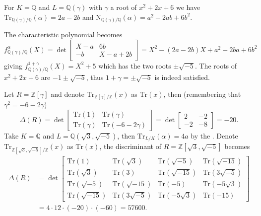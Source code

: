 \documentclass[openany, a4paper, 10pt]{book}
\theoremstyle{plain}
\theoremstyle{plain}
\theoremstyle{plain}
\theoremstyle{definition}
\theoremstyle{plain}
\theoremstyle{definition}
\theoremstyle{remark}
\begin{document}
\begin{examplebox}
    \tcbline
    For $K = \mathbb Q$ and $L = \mathbb Q(\gamma)$ with $\gamma$ a root of $x^2+2x+6$ we have
    $\mathrm{Tr}_{\mathbb Q(\gamma)/\mathbb Q}(\alpha) = 2a-2b$
    and
    $\mathrm{N}_{\mathbb Q(\gamma)/\mathbb Q}(\alpha) = a^2-2ab+6b^2$.

    The characteristic polynomial becomes
    $$f_{\mathbb Q(\gamma)/\mathbb Q}^\alpha(X) = \det \begin{bmatrix} X-a & 6b \\ -b & X-a+2b \end{bmatrix} = X^2 - (2a-2b)X + a^2-2ba+6b^2$$
    giving
    $f_{\mathbb Q(\gamma)/\mathbb Q}^{1+\gamma}(X) = X^2+5$
    which has the two roots $\pm\sqrt{-5}$.
    The roots of $x^2+2x+6$ are $-1 \pm \sqrt{-5}$, thus $1+\gamma = \pm \sqrt{-5}$ is indeed satisfied.

    Let $R = \mathbb Z[\gamma]$ and denote $\mathrm{Tr}_{\mathbb Z[\gamma]/\mathbb Z}(x)$ as $\mathrm{Tr}(x)$, then (remembering that $\gamma^2=-6-2\gamma$)
    \begin{equation*}
        \Delta(R) = \det \begin{bmatrix} \mathrm{Tr}(1) & \mathrm{Tr}(\gamma) \\ \mathrm{Tr}(\gamma) & \mathrm{Tr}(-6-2\gamma) \end{bmatrix}
        = \det \begin{bmatrix} 2 & -2 \\ -2 & -8 \end{bmatrix} = -20.
    \end{equation*}
    \tcbline
    Take $K = \mathbb Q$ and $L = \mathbb Q(\sqrt{3}, \sqrt{-5})$, then
    $\mathrm{Tr}_{L/K}(\alpha) = 4a$ by the .
    Denote $\mathrm{Tr}_{\mathbb Z[\sqrt{3}, \sqrt{-5}] / \mathbb Z} (x)$ as $\mathrm{Tr}(x)$, the discriminant of $R = \mathbb Z[\sqrt{3}, \sqrt{-5}]$ becomes
    \begin{align*}
        \Delta(R) &= \det
        \begin{bmatrix}
            \mathrm{Tr}(1) & \mathrm{Tr}(\sqrt{3}) & \mathrm{Tr}(\sqrt{-5}) & \mathrm{Tr}(\sqrt{-15}) \\
            \mathrm{Tr}(\sqrt{3}) & \mathrm{Tr}(3) & \mathrm{Tr}(\sqrt{-15}) & \mathrm{Tr}(3\sqrt{-5}) \\
            \mathrm{Tr}(\sqrt{-5}) & \mathrm{Tr}(\sqrt{-15}) & \mathrm{Tr}(-5) & \mathrm{Tr}(-5\sqrt{3}) \\
            \mathrm{Tr}(\sqrt{-15}) & \mathrm{Tr}(3\sqrt{-5}) & \mathrm{Tr}(-5\sqrt{3}) & \mathrm{Tr}(-15)
        \end{bmatrix} \\
                  &= 4 \cdot 12 \cdot (-20) \cdot (-60) = 57600.
    \end{align*}
\end{examplebox}
\end{document}
